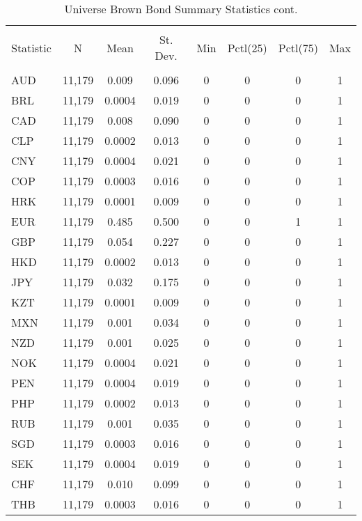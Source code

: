 \begin{table}[!htbp] \centering 
  \caption{Universe Brown Bond Summary Statistics cont.} 
  \label{} 
  \footnotesize
\begin{tabular}{@{\extracolsep{5pt}}lccccccc} 
\\[-1.8ex]\hline 
\hline \\[-1.8ex] 
Statistic & \multicolumn{1}{c}{N} & \multicolumn{1}{c}{Mean} & \multicolumn{1}{c}{St. Dev.} & \multicolumn{1}{c}{Min} & \multicolumn{1}{c}{Pctl(25)} & \multicolumn{1}{c}{Pctl(75)} & \multicolumn{1}{c}{Max} \\ 
\hline \\[-1.8ex] 
AUD & 11,179 & 0.009 & 0.096 & 0 & 0 & 0 & 1 \\ 
BRL & 11,179 & 0.0004 & 0.019 & 0 & 0 & 0 & 1 \\ 
CAD & 11,179 & 0.008 & 0.090 & 0 & 0 & 0 & 1 \\ 
CLP & 11,179 & 0.0002 & 0.013 & 0 & 0 & 0 & 1 \\ 
CNY & 11,179 & 0.0004 & 0.021 & 0 & 0 & 0 & 1 \\ 
COP & 11,179 & 0.0003 & 0.016 & 0 & 0 & 0 & 1 \\ 
HRK & 11,179 & 0.0001 & 0.009 & 0 & 0 & 0 & 1 \\ 
EUR & 11,179 & 0.485 & 0.500 & 0 & 0 & 1 & 1 \\ 
GBP & 11,179 & 0.054 & 0.227 & 0 & 0 & 0 & 1 \\ 
HKD & 11,179 & 0.0002 & 0.013 & 0 & 0 & 0 & 1 \\ 
JPY & 11,179 & 0.032 & 0.175 & 0 & 0 & 0 & 1 \\ 
KZT & 11,179 & 0.0001 & 0.009 & 0 & 0 & 0 & 1 \\ 
MXN & 11,179 & 0.001 & 0.034 & 0 & 0 & 0 & 1 \\ 
NZD & 11,179 & 0.001 & 0.025 & 0 & 0 & 0 & 1 \\ 
NOK & 11,179 & 0.0004 & 0.021 & 0 & 0 & 0 & 1 \\ 
PEN & 11,179 & 0.0004 & 0.019 & 0 & 0 & 0 & 1 \\ 
PHP & 11,179 & 0.0002 & 0.013 & 0 & 0 & 0 & 1 \\ 
RUB & 11,179 & 0.001 & 0.035 & 0 & 0 & 0 & 1 \\ 
SGD & 11,179 & 0.0003 & 0.016 & 0 & 0 & 0 & 1 \\ 
SEK & 11,179 & 0.0004 & 0.019 & 0 & 0 & 0 & 1 \\ 
CHF & 11,179 & 0.010 & 0.099 & 0 & 0 & 0 & 1 \\ 
THB & 11,179 & 0.0003 & 0.016 & 0 & 0 & 0 & 1 \\ 

\end{tabular}
\end{table}
